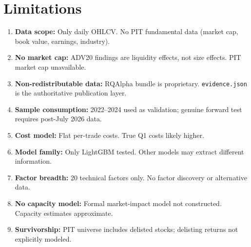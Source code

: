 \section{Limitations}
\begin{enumerate}[label=(\arabic*),leftmargin=*]
    \item \textbf{Data scope:} Only daily OHLCV. No PIT fundamental data (market cap, book value, earnings, industry).
    \item \textbf{No market cap:} ADV20 findings are liquidity effects, not size effects. PIT market cap unavailable.
    \item \textbf{Non-redistributable data:} RQAlpha bundle is proprietary. \texttt{evidence.json} is the authoritative publication layer.
    \item \textbf{Sample consumption:} 2022--2024 used as validation; genuine forward test requires post-July 2026 data.
    \item \textbf{Cost model:} Flat per-trade costs. True Q1 costs likely higher.
    \item \textbf{Model family:} Only LightGBM tested. Other models may extract different information.
    \item \textbf{Factor breadth:} 20 technical factors only. No factor discovery or alternative data.
    \item \textbf{No capacity model:} Formal market-impact model not constructed. Capacity estimates approximate.
    \item \textbf{Survivorship:} PIT universe includes delisted stocks; delisting returns not explicitly modeled.
\end{enumerate}
